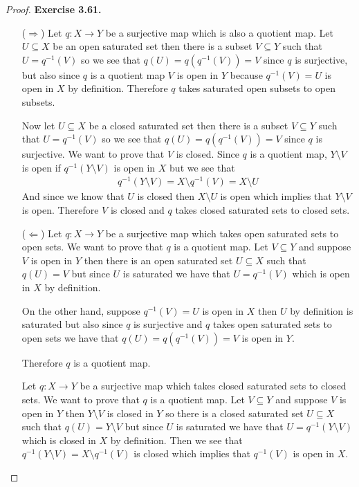 \documentclass[11pt]{article}
\newcommand{\setmin}{\setminus}
\theoremstyle{definition}
\begin{document}
\begin{proof}{\textbf{Exercise 3.61.}}
\begin{itemize}
    \item [($\Rightarrow$)] Let $q:X \to Y$ be a surjective map which is also
    a quotient map. Let $U\subseteq X$ be an open saturated set then there is
    a subset $V \subseteq Y$ such that $U = q^{-1}(V)$ so we see that
    $q(U) = q(q^{-1}(V)) = V$ since $q$ is surjective, but also since $q$
    is a quotient map $V$ is open in $Y$ because $q^{-1}(V) = U$
    is open in $X$ by definition. Therefore $q$ takes saturated open subsets
    to open subsets.
    
    Now let $U \subseteq X$ be a closed saturated set then there is a subset
    $V \subseteq Y$ such that $U = q^{-1}(V)$ so we see that
    $q(U) = q(q^{-1}(V)) = V$ since $q$ is surjective. We want to prove that
    $V$ is closed. Since $q$ is a quotient map, $Y \setmin V$ is open if
    $q^{-1}(Y \setmin V)$ is open in $X$ but we see that
    \begin{align*}
        q^{-1}(Y \setmin V) = X \setmin q^{-1}(V) = X \setmin U
    \end{align*}
    And since we know that $U$ is closed then $X \setmin U$ is open which
    implies that $Y \setmin V$ is open. Therefore $V$ is closed and 
    $q$ takes closed saturated sets to closed sets. 

    \item [($\Leftarrow$)] Let $q:X\to Y$ be a surjective map which takes open 
    saturated sets to open sets. We want to prove that $q$ is a quotient map.
    Let $V \subseteq Y$ and suppose $V$ is open in $Y$ then there is an
    open saturated set $U \subseteq X$ such that $q(U) = V$ but since 
    $U$ is saturated we have that $U = q^{-1}(V)$ which is open in $X$
    by definition.

    On the other hand, suppose $q^{-1}(V) = U$ is open in $X$ then $U$
    by definition is saturated but also since $q$ is surjective and 
    $q$ takes open saturated sets to open sets we have that
    $q(U) = q(q^{-1}(V)) = V$ is open in $Y$.

    Therefore $q$ is a quotient map.

    Let $q:X\to Y$ be a surjective map which takes closed saturated sets to
    closed sets. We want to prove that $q$ is a quotient map.
    Let $V \subseteq Y$ and suppose $V$ is open in $Y$ then
    $Y \setmin V$ is closed in $Y$ so there is a
    closed saturated set $U \subseteq X$ such that $q(U) = Y \setmin V$
    but since  $U$ is saturated we have that $U = q^{-1}(Y \setmin V)$
    which is closed in $X$ by definition. Then we see that
    $q^{-1}(Y\setmin V) = X \setmin q^{-1}(V)$ is closed which implies 
    that $q^{-1}(V)$ is open in $X$.


\end{itemize}
\end{proof}
\end{document}
